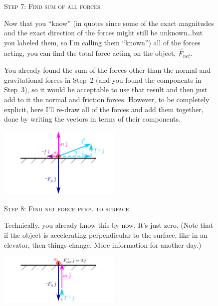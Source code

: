 \documentclass[10pt,letterpaper,twoside]{article}
\begin{document}
\begin{figure}[h!]
  \begin{minipage}[l]{0.70\textwidth}
	{\Large\textsc{Step 7}:} {\large\textsc{Find sum of all forces}}{\quad}

	Now that you ``know'' (in quotes since some of the exact magnitudes and the exact direction of the forces might still be unknown\ldots but you labeled them, so I'm calling them ``known'') all of the forces acting, you can find the total force acting on the object, $\vec F_{net}$.

	\vspace{10pt}
	You already found the sum of the forces other than the normal and gravitational forces in Step~2 (and you found the components in Step~3), so it would be acceptable to use that result and then just add to it the normal and friction forces.
	However, to be completely explicit, here I'll re-draw all of the forces and add them together, done by writing the vectors in terms of their components.
%
  \end{minipage}
  \begin{minipage}[c]{0.25\textwidth}
	\includegraphics[keepaspectratio=true,width=2.30in]{./how_to_normal_force_and_friction_f07.pdf}
    \label{fig:07}
  \end{minipage}
\end{figure}
\FloatBarrier
\begin{figure}[h!]
  \begin{minipage}[l]{0.70\textwidth}
	{\Large\textsc{Step 8}:} {\large\textsc{Find net force perp. to surface}}{\quad}

	Technically, you already know this by now. It's just zero. (Note that if the object is accelerating perpendicular to the surface, like in an elevator, then things change.
	More information for another day.)
  \end{minipage}
  \begin{minipage}[c]{0.25\textwidth}
	\includegraphics[keepaspectratio=true,width=2.30in]{./how_to_normal_force_and_friction_f08.pdf}
    \label{fig:08}
  \end{minipage}
\end{figure}
\end{document}
